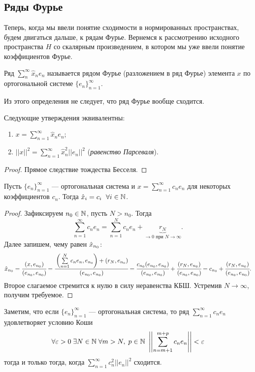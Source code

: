 \subsection{Ряды Фурье}
Теперь, когда мы ввели понятие сходимости в нормированных пространствах, будем двигаться дальше, к рядам Фурье. Вернемся к рассмотрению исходного пространства $H$ со скалярным произведением, в котором мы уже ввели понятие коэффициентов Фурье.
\begin{Def}
    Ряд $\sum\limits_{n}^{\infty} \hat{x}_ne_n$ называется рядом Фурье (разложением в ряд Фурье) элемента $x$ по ортогональной системе $\{e_n\}_{n=1}^{\infty}$.
\end{Def}
Из этого определения не следует, что ряд Фурье вообще сходится.
\begin{Statement}
    Следующие утверждения эквивалентны:
    \begin{enumerate}
        \item $x = \sum\limits_{n=1}^{\infty} \hat{x}_ne_n$;
        \item $||x||^2 = \sum\limits_{n=1}^{\infty} \hat{x}^2_n ||e_n||^2$ (\textit{равенство Парсеваля}).
    \end{enumerate}
\end{Statement}
\begin{proof}
    Прямое следствие тождества Бесселя.
\end{proof}
\begin{Statement}
    Пусть $\{e_n\}_{n=1}^{\infty}$ --- ортогональная система и $x = \sum\limits_{n=1}^{\infty}c_n e_n$ для некоторых коэффициентов $c_n$. Тогда $\hat{x}_i = c_i\;\ \forall i \in \mathbb{N}$.
\end{Statement}
\begin{proof}
    Зафиксируем $n_0\in \mathbb{N}$, пусть $N>n_0$. Тогда
    $$
        \sum\limits_{n=1}^{\infty} c_ne_n = \sum \limits_{n=1}^{N}c_n e_n + \underbrace{r_N}_{\to 0 \text{ при } N\to \infty}.
    $$
    Далее запишем, чему равен $\hat{x}_{n_0}$:
    $$
        \hat{x}_{n_0} = \cfrac{(x,e_{n_0})}{(e_{n_0}, e_{n_0})} = \cfrac{\left(\sum\limits_{n=1}^{N} c_ne_n, e_{n_0}\right) + \left(r_N, e_{n_0}\right)}{(e_{n_0}, e_{n_0})} = \cfrac{c_{n_0}(e_{n_0}, e_{n_0})}{(e_{n_0}, e_{n_0})} + \cfrac{(r_N, e_{n_0})}{(e_{n_0}, e_{n_0})} = c_{n_0} + \cfrac{(r_N, e_{n_0})}{(e_{n_0}, e_{n_0})}.
    $$
    Второе слагаемое стремится к нулю в силу неравенства КБШ. Устремив $N \to \infty$, получим требуемое.
\end{proof}
\begin{Statement}
Заметим, что если $\{e_n\}_{n=1}^{\infty}$ --- ортогональная система, то ряд $\sum\limits_{n=1}^{\infty} c_n e_n$ удовлетворяет условию Коши 
$$
    \forall \varepsilon>0\; \exists N\in \mathbb{N}\; \forall m>N,\; p\in \mathbb{N} \  \left|\left|\sum\limits_{n=m+1}^{m+p}c_ne_n \right|\right| < \varepsilon
$$
тогда и только тогда, когда $\sum\limits_{n=1}^{\infty}c_n^2||e_n||^2$ сходится.
\end{Statement}

